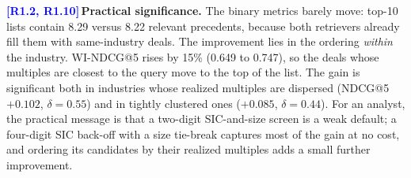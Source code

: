 \documentclass[conference]{IEEEtran}
\newcommand{\rc}[1]{\textcolor{blue}{\textbf{[#1]}}\,}
\newcommand{\rc}[1]{}
\begin{document}
\begin{table}[t]
\centering
\caption{Paired differences under the outcome-grounded construct (cluster-bootstrap Holm $p$ over the 880-comparison family; $\delta$: paired Cliff's delta).}
\label{tab:sig}
\footnotesize
\setlength{\tabcolsep}{3pt}
\end{table}


\rc{R1.2, R1.10}\noindent\textbf{Practical significance.}
The binary metrics barely move: top-10 lists contain 8.29 versus 8.22 relevant precedents, because both retrievers already fill them with same-industry deals. The improvement lies in the ordering \emph{within} the industry. WI-NDCG@5 rises by 15\% (0.649 to 0.747), so the deals whose multiples are closest to the query move to the top of the list. The gain is significant both in industries whose realized multiples are dispersed (NDCG@5 $+0.102$, $\delta=0.55$) and in tightly clustered ones ($+0.085$, $\delta=0.44$). For an analyst, the practical message is that a two-digit SIC-and-size screen is a weak default; a four-digit SIC back-off with a size tie-break captures most of the gain at no cost, and ordering its candidates by their realized multiples adds a small further improvement.
\end{document}

